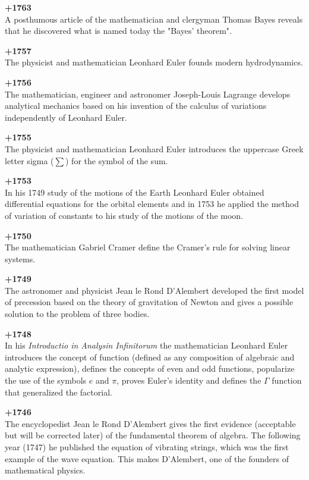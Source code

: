 \textbf{+1763}\\
A posthumous article of the mathematician and clergyman Thomas Bayes reveals that he discovered what is named today the "Bayes' theorem".

\textbf{+1757}\\
The physicist and mathematician Leonhard Euler founds modern hydrodynamics.

\textbf{+1756}\\
The mathematician, engineer and astronomer Joseph-Louis Lagrange develops analytical mechanics based on his invention of the calculus of variations independently of Leonhard Euler.

\textbf{+1755}\\
The physicist and mathematician Leonhard Euler introduces the uppercase Greek letter sigma ($\sum$) for the symbol of the sum.

\textbf{+1753}\\
In his 1749 study of the motions of the Earth Leonhard Euler obtained differential equations for the orbital elements and in 1753 he applied the method of variation of constants to his study of the motions of the moon.

\textbf{+1750}\\
The mathematician Gabriel Cramer define the Cramer's rule for solving linear systems.

\textbf{+1749}\\
The astronomer and physicist Jean le Rond D'Alembert developed the first model of precession based on the theory of gravitation of Newton and gives a possible solution to the problem of three bodies.

\textbf{+1748}\\
In his \textit{Introductio in Analysin Infinitorum} the mathematician Leonhard Euler introduces the concept of function (defined as any composition of algebraic and analytic expression), defines the concepts of even and odd functions, popularize the use of the symbols $e$ and $\pi$, proves Euler's identity and defines the $\Gamma$ function that generalized the factorial.

\textbf{+1746}\\
The encyclopedist Jean le Rond D'Alembert gives the first evidence (acceptable but will be corrected later) of the fundamental theorem of algebra. The following year (1747) he published the equation of vibrating strings, which was the first example of the wave equation. This makes D'Alembert, one of the founders of mathematical physics.

